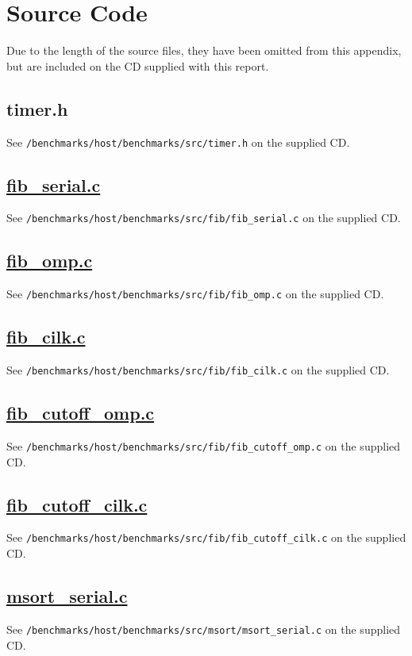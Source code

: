 \documentclass{report}
\newcommand\purl[1]{\protect\url{#1}} %
\begin{document}
\section{Source Code} \label{App:sourcecode}
Due to the length of the source files, they have been omitted from this appendix, but are included on the CD supplied with this report.

\subsection{timer.h} \label{App:timerh}
See \verb!/benchmarks/host/benchmarks/src/timer.h! on the supplied CD.

\subsection{\purl{fib_serial.c}} \label{App:fibserialc}
See \verb!/benchmarks/host/benchmarks/src/fib/fib_serial.c! on the supplied CD.

\subsection{\purl{fib_omp.c}} \label{App:fibompc}
See \verb!/benchmarks/host/benchmarks/src/fib/fib_omp.c! on the supplied CD.

\subsection{\purl{fib_cilk.c}} \label{App:fibcilkc}
See \verb!/benchmarks/host/benchmarks/src/fib/fib_cilk.c! on the supplied CD.

\subsection{\purl{fib_cutoff_omp.c}} \label{App:fibcutoffompc}
See \verb!/benchmarks/host/benchmarks/src/fib/fib_cutoff_omp.c! on the supplied CD.

\subsection{\purl{fib_cutoff_cilk.c}} \label{App:fibcutoffcilkc}
See \verb!/benchmarks/host/benchmarks/src/fib/fib_cutoff_cilk.c! on the supplied CD.

\subsection{\purl{msort_serial.c}} \label{App:msortserialc}
See \verb!/benchmarks/host/benchmarks/src/msort/msort_serial.c! on the supplied CD.
\end{document}
